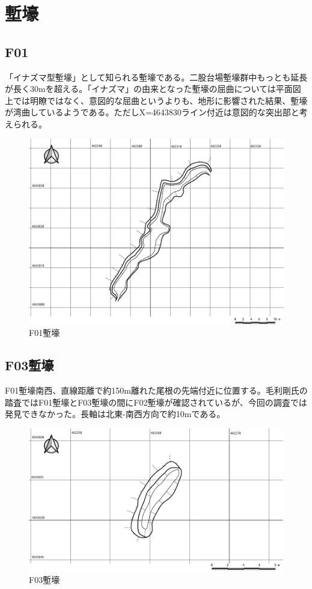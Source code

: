 \documentclass[14Q]{jsarticle}
\begin{document}
\section{塹壕}
\subsection{F01}
「イナズマ型塹壕」として知られる塹壕である。二股台場塹壕群中もっとも延長が長く30mを超える。「イナズマ」の由来となった塹壕の屈曲については平面図上では明瞭ではなく、意図的な屈曲というよりも、地形に影響された結果、塹壕が湾曲しているようである。ただしX=4643830ライン付近は意図的な突出部と考えられる。

\begin{figure}[h]
\centering
\includegraphics[width=160truemm]{fig/F01.pdf}
\caption{F01塹壕}
\label{f01}
\end{figure}

\subsection{F03塹壕}
F01塹壕南西、直線距離で約150m離れた尾根の先端付近に位置する。毛利剛氏の踏査ではF01塹壕とF03塹壕の間にF02塹壕が確認されているが、今回の調査では発見できなかった。長軸は北東-南西方向で約10mである。

\begin{figure}[h]
\centering
\includegraphics[width=160truemm]{fig/F03.pdf}
\caption{F03塹壕}
\label{f01}
\end{figure}
\end{document}
